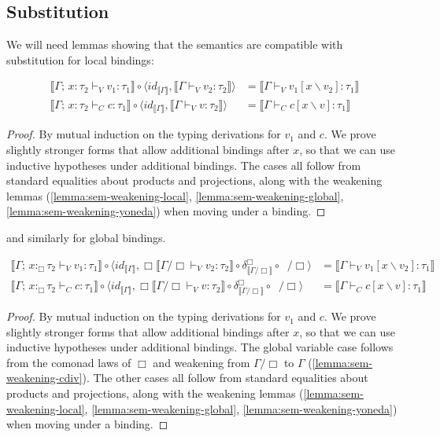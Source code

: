 \documentclass[acmsmall, screen, review, anonymous]{acmart}
\theoremstyle{definition}
\newcommand{\glob}{\mathop{\Box}}
\newcommand{\sem}[1]{\llbracket #1 \rrbracket}
\newcommand{\comult}[1]{\delta^{#1}}
\newcommand{\types}{\mathrel{:}}
\newcommand{\gtypes}{\mathrel{:_{\Box}}}
\newcommand{\ccons}[2]{#1;\,#2}
\newcommand{\lbind}[3]{\ccons{#1}{#2\types#3}}
\newcommand{\gbind}[3]{\ccons{#1}{#2\gtypes#3}}
\newcommand{\cdiv}[1]{#1/\Box}
\newcommand{\bdiv}[1]{\cdiv{\mathop{!_{#1}}}}
\newcommand{\sub}[2]{[#1\backslash#2]}
\newcommand{\sbst}[3]{#1\sub{#2}{#3}}
\newcommand{\turnv}{\mathrel{\vdash_V}}
\newcommand{\turnc}{\mathrel{\vdash_C}}
\begin{document}
\subsection{Substitution}

We will need lemmas showing that the semantics are compatible with substitution for local bindings:
\begin{lemma}
\label{lemma:sem-subst-local}
\begin{align*}
  \sem{\lbind{\Gamma}{x}{\tau_2} \turnv v_1 \types \tau_1}
      \circ \langle id_{\sem{\Gamma}}, \sem{\Gamma \turnv v_2 \types \tau_2} \rangle
  &= \sem{\Gamma \turnv \sbst{v_1}{x}{v_2} \types \tau_1} \\
  \sem{\lbind{\Gamma}{x}{\tau_2} \turnc c \types \tau_1}
      \circ \langle id_{\sem{\Gamma}}, \sem{\Gamma \turnv v \types \tau_2} \rangle
  &= \sem{\Gamma \turnc \sbst{c}{x}{v} \types \tau_1}
\end{align*}
\end{lemma}
\begin{proof}
  By mutual induction on the typing derivations for $v_1$ and $c$. We
  prove slightly stronger forms that allow additional bindings after
  $x$, so that we can use inductive hypotheses under additional
  bindings. The cases all follow from standard equalities about
  products and projections, along with the weakening lemmas
  (\ref{lemma:sem-weakening-local}, \ref{lemma:sem-weakening-global},
  \ref{lemma:sem-weakening-yoneda}) when moving under a binding.
\end{proof}

and similarly for global bindings.
\begin{lemma}
\label{lemma:sem-subst-global}
\begin{align*}
  \sem{\gbind{\Gamma}{x}{\tau_2} \turnv v_1 \types \tau_1}
    \circ \langle id_{\sem{\Gamma}},
  \glob \sem{\cdiv{\Gamma} \turnv v_2 \types \tau_2}
  \circ \comult{\glob}_{\sem{\cdiv{\Gamma}}} \circ \bdiv{\Gamma} \rangle
  &= \sem{\Gamma \turnv \sbst{v_1}{x}{v_2} \types \tau_1} \\
  \sem{\gbind{\Gamma}{x}{\tau_2} \turnc c \types \tau_1}
    \circ \langle id_{\sem{\Gamma}},
  \glob \sem{\cdiv{\Gamma} \turnv v \types \tau_2}
  \circ \comult{\glob}_{\sem{\cdiv{\Gamma}}} \circ \bdiv{\Gamma} \rangle
  &= \sem{\Gamma \turnc \sbst{c}{x}{v} \types \tau_1}
\end{align*}
\end{lemma}
\begin{proof}
  By mutual induction on the typing derivations for $v_1$ and $c$. We
  prove slightly stronger forms that allow additional bindings after
  $x$, so that we can use inductive hypotheses under additional
  bindings. The global variable case follows from the comonad laws of
  $\glob$ and weakening from $\cdiv{\Gamma}$ to $\Gamma$
  (\ref{lemma:sem-weakening-cdiv}).  The other cases all follow from
  standard equalities about products and projections, along with the
  weakening lemmas (\ref{lemma:sem-weakening-local},
  \ref{lemma:sem-weakening-global}, \ref{lemma:sem-weakening-yoneda})
  when moving under a binding.
\end{proof}
\end{document}
